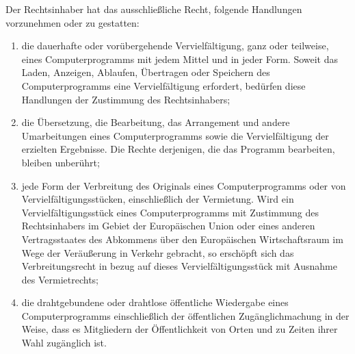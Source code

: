 \documentclass{scrreprt}
\begin{document}
Der Rechtsinhaber hat das ausschließliche Recht, folgende Handlungen vorzunehmen oder zu gestatten: 
\begin{enumerate}[label=\arabic*.]
\item die dauerhafte oder vorübergehende Vervielfältigung, ganz oder teilweise, eines Computerprogramms mit jedem Mittel und in jeder Form. Soweit das Laden, Anzeigen, Ablaufen, Übertragen oder Speichern des Computerprogramms eine Vervielfältigung erfordert, bedürfen diese Handlungen der Zustimmung des Rechtsinhabers; 
\item die Übersetzung, die Bearbeitung, das Arrangement und andere Umarbeitungen eines Computerprogramms sowie die Vervielfältigung der erzielten Ergebnisse. Die Rechte derjenigen, die das Programm bearbeiten, bleiben unberührt; 
\item jede Form der Verbreitung des Originals eines Computerprogramms oder von Vervielfältigungsstücken, einschließlich der Vermietung. Wird ein Vervielfältigungsstück eines Computerprogramms mit Zustimmung des Rechtsinhabers im Gebiet der Europäischen Union oder eines anderen Vertragsstaates des Abkommens über den Europäischen Wirtschaftsraum im Wege der Veräußerung in Verkehr gebracht, so erschöpft sich das Verbreitungsrecht in bezug auf dieses Vervielfältigungsstück mit Ausnahme des Vermietrechts; 
\item die drahtgebundene oder drahtlose öffentliche Wiedergabe eines Computerprogramms einschließlich der öffentlichen Zugänglichmachung in der Weise, dass es Mitgliedern der Öffentlichkeit von Orten und zu Zeiten ihrer Wahl zugänglich ist.
\end{enumerate}

\end{document}
